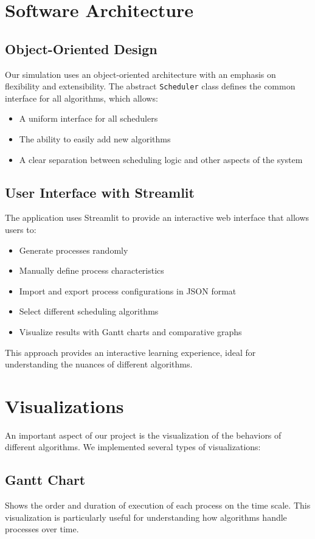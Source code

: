 \documentclass[12pt,a4paper]{article}
\begin{document}
\section{Software Architecture}
\subsection{Object-Oriented Design}
Our simulation uses an object-oriented architecture with an emphasis on flexibility and extensibility. The abstract \texttt{Scheduler} class defines the common interface for all algorithms, which allows:
\begin{itemize}
    \item A uniform interface for all schedulers
    \item The ability to easily add new algorithms
    \item A clear separation between scheduling logic and other aspects of the system
\end{itemize}

\subsection{User Interface with Streamlit}
The application uses Streamlit to provide an interactive web interface that allows users to:
\begin{itemize}
    \item Generate processes randomly
    \item Manually define process characteristics
    \item Import and export process configurations in JSON format
    \item Select different scheduling algorithms
    \item Visualize results with Gantt charts and comparative graphs
\end{itemize}

This approach provides an interactive learning experience, ideal for understanding the nuances of different algorithms.

\section{Visualizations}
An important aspect of our project is the visualization of the behaviors of different algorithms. We implemented several types of visualizations:

\subsection{Gantt Chart}
Shows the order and duration of execution of each process on the time scale. This visualization is particularly useful for understanding how algorithms handle processes over time.
\end{document}
